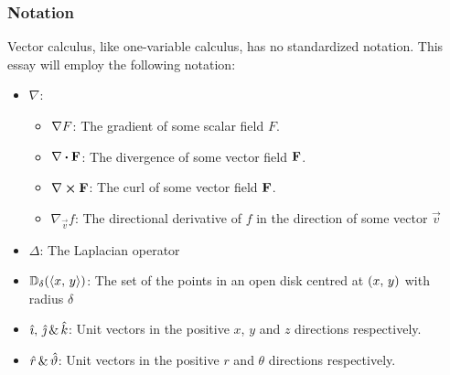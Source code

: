 \subsubsection{Notation}
Vector calculus, like one-variable calculus, has no standardized notation. This essay will employ the following
notation:
\begin{itemize}
	\item $\nabla$:
	\begin{itemize}
		\item $\nabla F$: The gradient of some scalar field $F$.
		\item $\divergence{\fatf}$: The divergence of some vector field $\mathbf{F}$.
		\item $\curl{\fatf}$: The curl of some vector field $\mathbf{F}$.
		\item $\nabla_\vec{v}f$: The directional derivative of $f$ in the direction of some vector $\vec{v}$
	\end{itemize}
	\item $\Delta$: The Laplacian operator
	\item $\mathbb{D}_\delta(\langle x,\,y\rangle)$: The set of the points in an open disk centred at $\left(x,\,y\right)$ with radius $\delta$
	\item $\hat{\imath},\,\hat{\jmath}\,\&\,\hat{k}$: Unit vectors in the positive $x$, $y$ and $z$ directions respectively.
	\item $\hat{r}\,\&\,\hat{\vartheta}$: Unit vectors in the positive $r$ and $\theta$ directions respectively.
\end{itemize}

